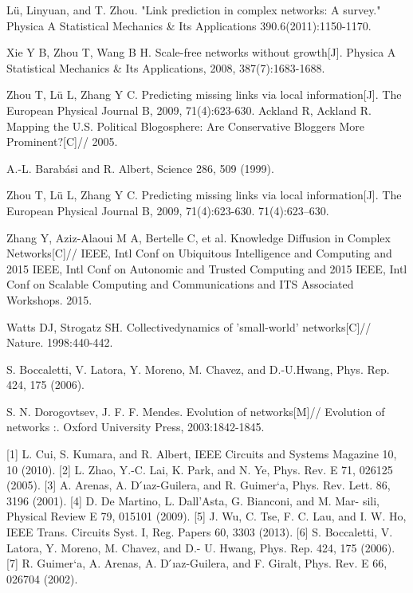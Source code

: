 \documentclass[onecolumn,preprintnumbers,amsmath,amssymb]{revtex4}
\begin{document}
\begin{thebibliography}{00}
Lü, Linyuan, and T. Zhou. "Link prediction in complex networks: A survey." Physica A Statistical Mechanics \& Its Applications 390.6(2011):1150-1170.


Xie Y B, Zhou T, Wang B H. Scale-free networks without growth[J]. Physica A Statistical Mechanics \& Its Applications, 2008, 387(7):1683-1688.

Zhou T, Lü L, Zhang Y C. Predicting missing links via local information[J]. The European Physical Journal B, 2009, 71(4):623-630.
Ackland R, Ackland R. Mapping the U.S. Political Blogosphere: Are Conservative Bloggers More Prominent?[C]// 2005.

A.-L. Barabási and R. Albert, Science 286, 509 (1999).

Zhou T, Lü L, Zhang Y C. Predicting missing links via local information[J]. The European Physical Journal B, 2009, 71(4):623-630.
71(4):623–630. 

Zhang Y, Aziz-Alaoui M A, Bertelle C, et al. Knowledge Diffusion in Complex Networks[C]// IEEE, Intl Conf on Ubiquitous Intelligence and Computing and 2015 IEEE, Intl Conf on Autonomic and Trusted Computing and 2015 IEEE, Intl Conf on Scalable Computing and Communications and ITS Associated Workshops. 2015.

Watts DJ, Strogatz SH. Collectivedynamics of ’small-world’ networks[C]// Nature. 1998:440-442.

S. Boccaletti, V. Latora, Y. Moreno, M. Chavez, and D.-U.Hwang, Phys. Rep. 424, 175 (2006).

S. N. Dorogovtsev, J. F. F. Mendes. Evolution of networks[M]// Evolution of networks :. Oxford University Press, 2003:1842-1845.


[1] L. Cui, S. Kumara, and R. Albert, IEEE Circuits and Systems Magazine 10, 10 (2010).
[2] L. Zhao, Y.-C. Lai, K. Park, and N. Ye, Phys. Rev. E 71, 026125 (2005).
[3] A. Arenas, A. D ́ıaz-Guilera, and R. Guimer`a, Phys. Rev. Lett. 86, 3196 (2001).
[4] D. De Martino, L. Dall’Asta, G. Bianconi, and M. Mar- sili, Physical Review E 79, 015101 (2009).
[5] J. Wu, C. Tse, F. C. Lau, and I. W. Ho, IEEE Trans. Circuits Syst. I, Reg. Papers 60, 3303 (2013).
[6] S. Boccaletti, V. Latora, Y. Moreno, M. Chavez, and D.- U. Hwang, Phys. Rep. 424, 175 (2006).
[7] R. Guimer`a, A. Arenas, A. D ́ıaz-Guilera, and F. Giralt, Phys. Rev. E 66, 026704 (2002).


\end{thebibliography}
\end{document}
